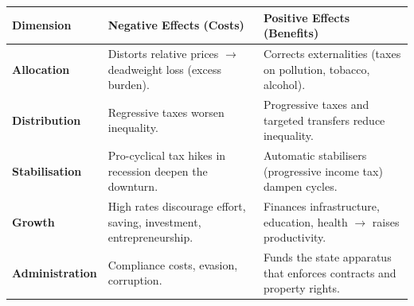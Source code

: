 \documentclass[11pt]{article}
\begin{document}
\begin{center}
\begin{tabularx}{\linewidth}{|l|X|X|}
\hline
\rowcolor{popblueL}
\textbf{Dimension} & \textbf{Negative Effects (Costs)} & \textbf{Positive Effects (Benefits)} \\
\hline
\textbf{Allocation} & Distorts relative prices $\rightarrow$ deadweight loss (excess burden). & Corrects externalities (taxes on pollution, tobacco, alcohol). \\
\hline
\textbf{Distribution} & Regressive taxes worsen inequality. & Progressive taxes and targeted transfers reduce inequality. \\
\hline
\textbf{Stabilisation} & Pro-cyclical tax hikes in recession deepen the downturn. & Automatic stabilisers (progressive income tax) dampen cycles. \\
\hline
\textbf{Growth} & High rates discourage effort, saving, investment, entrepreneurship. & Finances infrastructure, education, health $\rightarrow$ raises productivity. \\
\hline
\textbf{Administration} & Compliance costs, evasion, corruption. & Funds the state apparatus that enforces contracts and property rights. \\
\hline
\end{tabularx}
\end{center}
\end{document}
